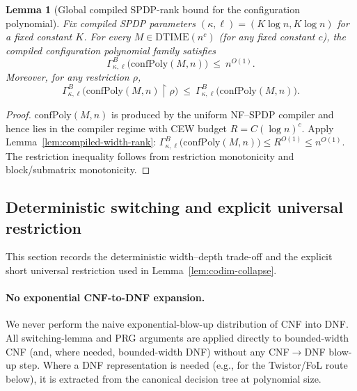 \documentclass[12pt]{article}
\newtheorem{lemma}[theorem]{Lemma}
\theoremstyle{definition}
\theoremstyle{definition}
\theoremstyle{remark}
\theoremstyle{remark}
\begin{document}
\begin{lemma}[Global compiled SPDP-rank bound for the configuration polynomial]
\label{lem:global-rank-bound-confpoly}
Fix compiled SPDP parameters $(\kappa,\ell)=(K\log n, K\log n)$ for a fixed constant $K$.
For every $M\in \mathrm{DTIME}(n^{c})$ (for any fixed constant $c$), the compiled configuration polynomial family satisfies
\[
\Gamma^B_{\kappa,\ell}\!\big(\mathrm{confPoly}(M,n)\big)\ \le\ n^{O(1)}.
\]
Moreover, for any restriction $\rho$,
\[
\Gamma^B_{\kappa,\ell}\!\big(\mathrm{confPoly}(M,n)\!\upharpoonright\!\rho\big)\ \le\
\Gamma^B_{\kappa,\ell}\!\big(\mathrm{confPoly}(M,n)\big).
\]
\end{lemma}

\begin{proof}
$\mathrm{confPoly}(M,n)$ is produced by the uniform NF--SPDP compiler and hence lies in the
compiler regime with CEW budget $R=C(\log n)^c$. Apply Lemma~\ref{lem:compiled-width-rank}:
$\Gamma^B_{\kappa,\ell}\!\big(\mathrm{confPoly}(M,n)\big)\le R^{O(1)}\le n^{O(1)}$.
The restriction inequality follows from restriction monotonicity and block/submatrix monotonicity.
\end{proof}


\subsection{Deterministic switching and explicit universal restriction}

This section records the deterministic width--depth trade-off and the explicit short universal restriction used in Lemma~\ref{lem:codim-collapse}.


\paragraph{No exponential CNF-to-DNF expansion.}
We never perform the naive exponential-blow-up distribution of CNF into DNF.
All switching-lemma and PRG arguments are applied directly to bounded-width CNF
(and, where needed, bounded-width DNF) without any CNF$\to$DNF blow-up step.
Where a DNF representation is needed (e.g., for the Twistor/FoL route below),
it is extracted from the canonical decision tree at polynomial size.
\end{document}
